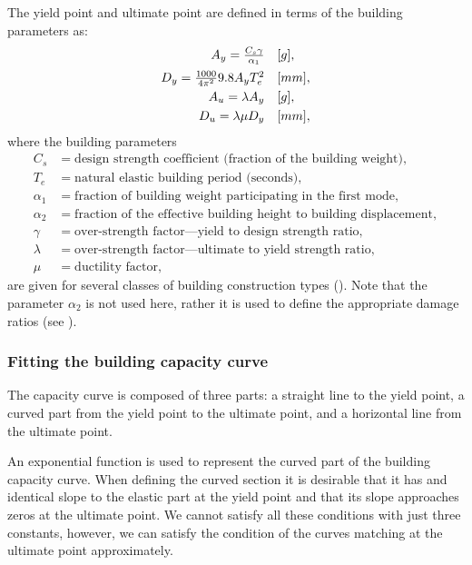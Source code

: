 The yield point and ultimate point are defined in terms of the
building parameters as: $$ \begin{array}{rl}
 A_y = \frac{C_s\gamma}{\alpha_1} & [g],  \vspace{0.5em} \\
 D_y = \frac{1000}{4\pi^2}9.8A_y T_e^2 & [mm],\vspace{0.3em} \\
 A_u = \lambda A_y & [g], \vspace{0.3em} \\
 D_u = \lambda\mu D_y & [mm], \\
 \end{array}
$$
where the building parameters
\begin{align*}
C_s &= \text{design strength coefficient (fraction of the building weight)},\\
T_e &= \text{natural elastic building period (seconds)},\\
\alpha_1 &= \text{fraction of building weight participating in the
  first mode},\\
\alpha_2 &= \text{fraction of the effective building height to
building displacement},\\
\gamma &= \text{over-strength factor---yield to design strength ratio},\\
\lambda &= \text{over-strength factor---ultimate to yield strength ratio},\\
\mu &= \text{ductility factor},
\end{align*}
are given for several classes of building construction types
(). Note that the parameter
$\alpha_2$ is not used here, rather it is used to define the
appropriate damage ratios (see ).


\subsubsection{Fitting the building capacity curve}

The capacity curve is composed of three
parts: a straight line to the yield point, a curved part from the
yield point to the ultimate point, and a horizontal line from the
ultimate point.


An exponential function is used to represent the curved part of
the building capacity curve.  When defining
the curved section it is desirable that it has and identical slope
to the elastic part at the yield point and that its slope
approaches zeros at the ultimate point. We cannot satisfy all
these conditions with just three constants, however, we can
satisfy the condition of the curves matching at the ultimate point
approximately.

